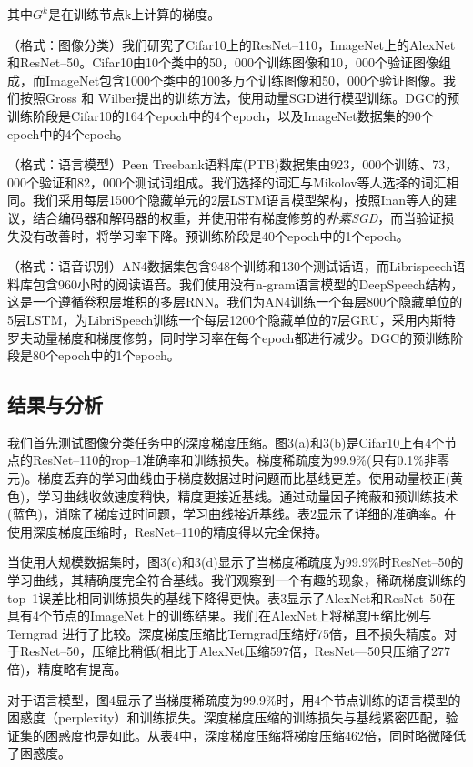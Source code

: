 其中$G^k$是在训练节点k上计算的梯度。

（格式：图像分类）我们研究了Cifar10上的ResNet--110，ImageNet上的AlexNet和ResNet--50。Cifar10由10个类中的50，000个训练图像和10，000个验证图像组成，而ImageNet包含1000个类中的100多万个训练图像和50，000个验证图像。我们按照Gross 和 Wilber提出的训练方法，使用动量SGD进行模型训练。DGC的预训练阶段是Cifar10的164个epoch中的4个epoch，以及ImageNet数据集的90个epoch中的4个epoch。

（格式：语言模型）Peen Treebank语料库(PTB)数据集由923，000个训练、73，000个验证和82，000个测试词组成。我们选择的词汇与Mikolov等人选择的词汇相同。我们采用每层1500个隐藏单元的2层LSTM语言模型架构，按照Inan等人的建议，结合编码器和解码器的权重，并使用带有梯度修剪的\textit{朴素SGD}，而当验证损失没有改善时，将学习率下降。预训练阶段是40个epoch中的1个epoch。

（格式：语音识别）AN4数据集包含948个训练和130个测试话语，而Librispeech语料库包含960小时的阅读语音。我们使用没有n-gram语言模型的DeepSpeech结构，这是一个遵循卷积层堆积的多层RNN。我们为AN4训练一个每层800个隐藏单位的5层LSTM，为LibriSpeech训练一个每层1200个隐藏单位的7层GRU，采用内斯特罗夫动量梯度和梯度修剪，同时学习率在每个epoch都进行减少。DGC的预训练阶段是80个epoch中的1个epoch。

\subsection{结果与分析}
我们首先测试图像分类任务中的深度梯度压缩。图3(a)和3(b)是Cifar10上有4个节点的ResNet--110的rop--1准确率和训练损失。梯度稀疏度为99.9\%(只有0.1\%非零元)。梯度丢弃的学习曲线由于梯度数据过时问题而比基线更差。使用动量校正(黄色)，学习曲线收敛速度稍快，精度更接近基线。通过动量因子掩蔽和预训练技术(蓝色)，消除了梯度过时问题，学习曲线接近基线。表2显示了详细的准确率。在使用深度梯度压缩时，ResNet--110的精度得以完全保持。

当使用大规模数据集时，图3(c)和3(d)显示了当梯度稀疏度为99.9\%时ResNet--50的学习曲线，其精确度完全符合基线。我们观察到一个有趣的现象，稀疏梯度训练的top--1误差比相同训练损失的基线下降得更快。表3显示了AlexNet和ResNet--50在具有4个节点的ImageNet上的训练结果。我们在AlexNet上将梯度压缩比例与Terngrad 进行了比较。深度梯度压缩比Terngrad压缩好75倍，且不损失精度。对于ResNet--50，压缩比稍低(相比于AlexNet压缩597倍，ResNet—50只压缩了277倍)，精度略有提高。

对于语言模型，图4显示了当梯度稀疏度为99.9\%时，用4个节点训练的语言模型的困惑度（perplexity）和训练损失。深度梯度压缩的训练损失与基线紧密匹配，验证集的困惑度也是如此。从表4中，深度梯度压缩将梯度压缩462倍，同时略微降低了困惑度。

